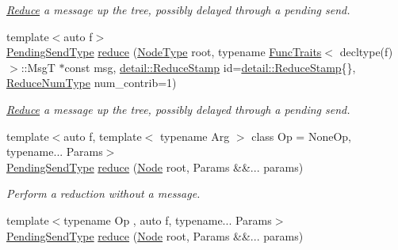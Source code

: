 \begin{DoxyCompactItemize}
\begin{DoxyCompactList}\small\item\em \hyperlink{structvt_1_1collective_1_1reduce_1_1_reduce}{Reduce} a message up the tree, possibly delayed through a pending send. \end{DoxyCompactList}\item 
{\footnotesize template$<$auto f$>$ }\\\hyperlink{structvt_1_1collective_1_1reduce_1_1_reduce_a0474b491f3c93014d9a0ce0356c6bfd5}{Pending\+Send\+Type} \hyperlink{structvt_1_1collective_1_1reduce_1_1_reduce_a0cd6c7ff3201b642905b60241138457f}{reduce} (\hyperlink{namespacevt_a866da9d0efc19c0a1ce79e9e492f47e2}{Node\+Type} root, typename \hyperlink{structvt_1_1_func_traits}{Func\+Traits}$<$ decltype(f)$>$\+::MsgT $\ast$const msg, \hyperlink{namespacevt_1_1collective_1_1reduce_1_1detail_abcd205dec83706f347d55c7528bf2664}{detail\+::\+Reduce\+Stamp} id=\hyperlink{namespacevt_1_1collective_1_1reduce_1_1detail_abcd205dec83706f347d55c7528bf2664}{detail\+::\+Reduce\+Stamp}\{\}, \hyperlink{structvt_1_1collective_1_1reduce_1_1_reduce_a6c3e63aca10c31d2823b0b18cf9762a4}{Reduce\+Num\+Type} num\+\_\+contrib=1)
\begin{DoxyCompactList}\small\item\em \hyperlink{structvt_1_1collective_1_1reduce_1_1_reduce}{Reduce} a message up the tree, possibly delayed through a pending send. \end{DoxyCompactList}\item 
{\footnotesize template$<$auto f, template$<$ typename Arg $>$ class Op = None\+Op, typename... Params$>$ }\\\hyperlink{structvt_1_1collective_1_1reduce_1_1_reduce_a0474b491f3c93014d9a0ce0356c6bfd5}{Pending\+Send\+Type} \hyperlink{structvt_1_1collective_1_1reduce_1_1_reduce_a27af5fdbab0b1c2767bdbcff6dced032}{reduce} (\hyperlink{namespacevt_a04777c732e1a2b2c317995af9972b999}{Node} root, Params \&\&... params)
\begin{DoxyCompactList}\small\item\em Perform a reduction without a message. \end{DoxyCompactList}\item 
{\footnotesize template$<$typename Op , auto f, typename... Params$>$ }\\\hyperlink{structvt_1_1collective_1_1reduce_1_1_reduce_a0474b491f3c93014d9a0ce0356c6bfd5}{Pending\+Send\+Type} \hyperlink{structvt_1_1collective_1_1reduce_1_1_reduce_aea9bec63d9cecccc6ef530e4d003e03e}{reduce} (\hyperlink{namespacevt_a04777c732e1a2b2c317995af9972b999}{Node} root, Params \&\&... params)

\end{DoxyCompactItemize}
